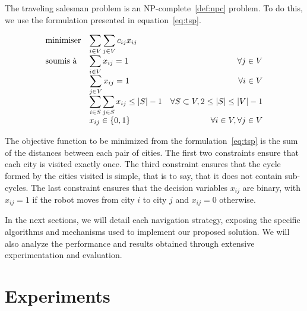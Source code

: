 The traveling salesman problem is an NP-complete~\ref{def:npc} problem.
To do this, we use the formulation presented in equation~\ref{eq:tsp}.

\begin{equation}
	\label{eq:tsp}
	\begin{array}{ll@{}rr}
		\text{minimiser} &
		\displaystyle\sum\limits_{i \in V} \sum\limits_{j \in V} c_{ij} x_{ij} &
		&
		\\
		\text{soumis à} &
		\displaystyle\sum\limits_{i \in V} x_{ij} = 1 &
		&
		\forall j \in V \\
		&
		\displaystyle\sum\limits_{j \in V} x_{ij} = 1 &
		&
		\forall i \in V \\
		&
		\displaystyle\sum\limits_{i \in S} \sum\limits_{j \in S} x_{ij} \leq |S| - 1 &
		&
		\forall S \subset V, 2 \leq |S| \leq |V| - 1 \\
		&
		x_{ij} \in \{0, 1\} &
		&
		\forall i \in V, \forall j \in V \\
	\end{array}
\end{equation}

The objective function to be minimized from the formulation~\ref{eq:tsp} is the sum of the distances between each pair of cities.
The first two constraints ensure that each city is visited exactly once.
The third constraint ensures that the cycle formed by the cities visited is simple, that is to say, that it does not contain sub-cycles.
The last constraint ensures that the decision variables $x_{ij}$ are binary, with $x_{ij} = 1$ if the robot moves from city $i$ to city $j$ and $x_{ij} = 0$ otherwise.


In the next sections, we will detail each navigation strategy, exposing the specific algorithms and mechanisms used to implement our proposed solution. We will also analyze the performance and results obtained through extensive experimentation and evaluation.







\section*{Experiments}

